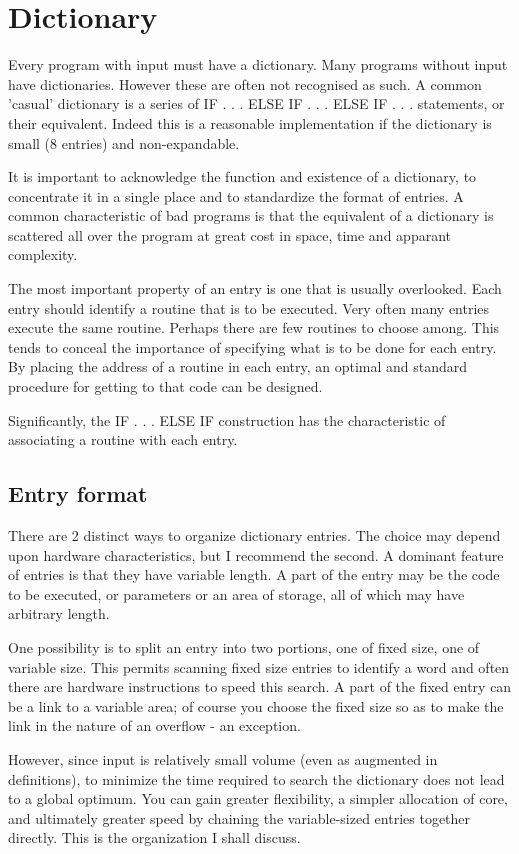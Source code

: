 \documentclass[b5paper, oneside]{book}
\begin{document}
\section{Dictionary}
Every program with input must have a dictionary. Many programs without input have dictionaries. However these are often not recognised as such. A common 'casual' dictionary is a series of IF . . . ELSE IF . . . ELSE IF . . . statements, or their equivalent. Indeed this is a reasonable implementation if the dictionary is small (8 entries) and non-expandable.

It is important to acknowledge the function and existence of a dictionary, to concentrate it in a single place and to standardize the format of entries. A common characteristic of bad programs is that the equivalent of a dictionary is scattered all over the program at great cost in space, time and apparant complexity.

The most important property of an entry is one that is usually overlooked. Each entry should identify a routine that is to be executed. Very often many entries execute the same routine. Perhaps there are few routines to choose among. This tends to conceal the importance of specifying what is to be done for each entry. By placing the address of a routine in each entry, an optimal and standard procedure for getting to that code can be designed.

Significantly, the IF . . . ELSE IF construction has the characteristic of associating a routine with each entry.

\subsection{Entry format}
There are 2 distinct ways to organize dictionary entries. The choice may depend upon hardware characteristics, but I recommend the second. A dominant feature of entries is that they have variable length. A part of the entry may be the code to be executed, or parameters or an area of storage, all of which may have arbitrary length.

One possibility is to split an entry into two portions, one of fixed size, one of variable size. This permits scanning fixed size entries to identify a word and often there are hardware instructions to speed this search. A part of the fixed entry can be a link to a variable area; of course you choose the fixed size so as to make the link in the nature of an overflow - an exception.

However, since input is relatively small volume (even as augmented in definitions), to minimize the time required to search the dictionary does not lead to a global optimum. You can gain greater flexibility, a simpler allocation of core, and ultimately greater speed by chaining the variable-sized entries together directly. This is the organization I shall discuss.
\end{document}
